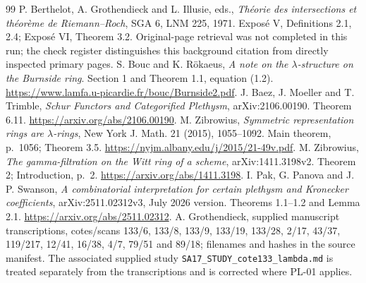 \documentclass[11pt,a4paper]{article}
\begin{document}
\begin{thebibliography}{99}
 P. Berthelot, A. Grothendieck and L. Illusie, eds., \emph{Th\'eorie des intersections et th\'eor\`eme de Riemann--Roch}, SGA 6, LNM 225, 1971. Expos\'e V, Definitions 2.1, 2.4; Expos\'e VI, Theorem 3.2. Original-page retrieval was not completed in this run; the check register distinguishes this background citation from directly inspected primary pages.
 S. Bouc and K. R\"okaeus, \emph{A note on the $\lambda$-structure on the Burnside ring}. Section 1 and Theorem 1.1, equation (1.2). \url{https://www.lamfa.u-picardie.fr/bouc/Burnside2.pdf}.
 J. Baez, J. Moeller and T. Trimble, \emph{Schur Functors and Categorified Plethysm}, arXiv:2106.00190. Theorem 6.11. \url{https://arxiv.org/abs/2106.00190}.
 M. Zibrowius, \emph{Symmetric representation rings are $\lambda$-rings}, New York J. Math. 21 (2015), 1055--1092. Main theorem, p.~1056; Theorem 3.5. \url{https://nyjm.albany.edu/j/2015/21-49v.pdf}.
 M. Zibrowius, \emph{The gamma-filtration on the Witt ring of a scheme}, arXiv:1411.3198v2. Theorem 2; Introduction, p.~2. \url{https://arxiv.org/abs/1411.3198}.
 I. Pak, G. Panova and J. P. Swanson, \emph{A combinatorial interpretation for certain plethysm and Kronecker coefficients}, arXiv:2511.02312v3, July 2026 version. Theorems 1.1--1.2 and Lemma 2.1. \url{https://arxiv.org/abs/2511.02312}.
 A. Grothendieck, supplied manuscript transcriptions, cotes/scans 133/6, 133/8, 133/9, 133/19, 133/28, 2/17, 43/37, 119/217, 12/41, 16/38, 4/7, 79/51 and 89/18; filenames and hashes in the source manifest. The associated supplied study \texttt{SA17\_STUDY\_cote133\_lambda.md} is treated separately from the transcriptions and is corrected where PL-01 applies.



\end{thebibliography}
\end{document}
